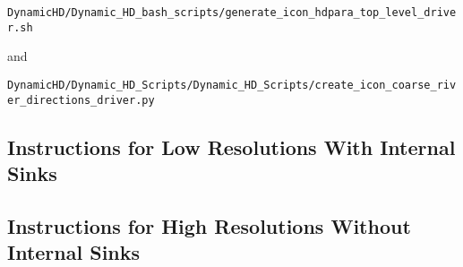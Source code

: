 \documentclass{article}
\begin{document}
\lstinline[style=bash_input]{DynamicHD/Dynamic_HD_bash_scripts/generate_icon_hdpara_top_level_driver.sh}

and 

\lstinline[style=bash_input]{DynamicHD/Dynamic_HD_Scripts/Dynamic_HD_Scripts/create_icon_coarse_river_directions_driver.py}

\subsection{Instructions for Low Resolutions With Internal Sinks}

%
%
%
\subsection{Instructions for High Resolutions Without Internal Sinks}

{}

\end{document}

